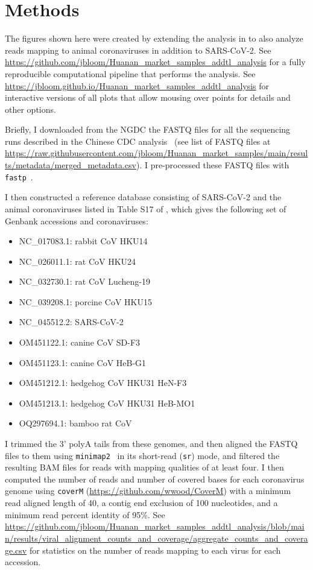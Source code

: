 \documentclass[9pt,twocolumn,twoside]{gsajnl_modified}
\begin{document}
{\small

\section{Methods}

The figures shown here were created by extending the analysis in \citet{bloom2023association} to also analyze reads mapping to animal coronaviruses in addition to SARS-CoV-2.
See \url{https://github.com/jbloom/Huanan_market_samples_addtl_analysis} for a fully reproducible computational pipeline that performs the analysis.
See \url{https://jbloom.github.io/Huanan_market_samples_addtl_analysis} for interactive versions of all plots that allow mousing over points for details and other options.

Briefly, I downloaded from the NGDC the FASTQ files for all the sequencing runs described in the Chinese CDC analysis~\citep{liu2023surveillance} (see list of FASTQ files at \url{https://raw.githubusercontent.com/jbloom/Huanan_market_samples/main/results/metadata/merged_metadata.csv}).
I pre-processed these FASTQ files with \texttt{fastp}~\citep{chen2018fastp}.

I then constructed a reference database consisting of SARS-CoV-2 and the animal coronaviruses listed in Table S17 of \citet{christoph2023genetic}, which gives the following set of Genbank accessions and coronaviruses:
\begin{itemize}
\item NC\_017083.1: rabbit CoV HKU14
\item NC\_026011.1: rat CoV HKU24
\item NC\_032730.1: rat CoV Lucheng-19
\item NC\_039208.1: porcine CoV HKU15
\item NC\_045512.2: SARS-CoV-2
\item OM451122.1: canine CoV SD-F3
 \item OM451123.1: canine CoV HeB-G1
 \item OM451212.1: hedgehog CoV HKU31 HeN-F3
 \item OM451213.1: hedgehog CoV HKU31 HeB-MO1
 \item OQ297694.1: bamboo rat CoV
\end{itemize}
I trimmed the 3' polyA tails from these genomes, and then aligned the FASTQ files to them using \texttt{minimap2}~\citep{li2018minimap2} in its short-read (\texttt{sr}) mode, and filtered the resulting BAM files for reads with mapping qualities of at least four.
I then computed the number of reads and number of covered bases for each coronavirus genome using \texttt{coverM} (\url{https://github.com/wwood/CoverM}) with a minimum read aligned length of 40, a contig end exclusion of 100 nucleotides, and a minimum read percent identity of 95\%.
See \url{https://github.com/jbloom/Huanan_market_samples_addtl_analysis/blob/main/results/viral_alignment_counts_and_coverage/aggregate_counts_and_coverage.csv} for statistics on the number of reads mapping to each virus for each accession.

}
\end{document}
